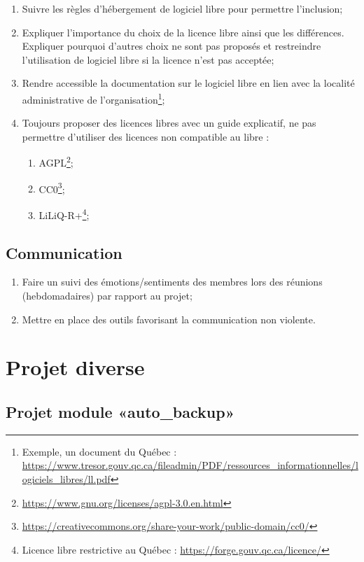 \begin{enumerate}
    \item Suivre les règles d'hébergement de logiciel libre pour permettre l'inclusion;
    \item Expliquer l'importance du choix de la licence libre ainsi que les différences. Expliquer pourquoi d'autres choix ne sont pas proposés et restreindre l'utilisation de logiciel libre si la licence n'est pas acceptée;
    \item Rendre accessible la documentation sur le logiciel libre en lien avec la localité administrative de l'organisation\footnote{Exemple, un document du Québec : \url{https://www.tresor.gouv.qc.ca/fileadmin/PDF/ressources_informationnelles/logiciels_libres/ll.pdf}};
    \item Toujours proposer des licences libres avec un guide explicatif, ne pas permettre d'utiliser des licences non compatible au libre :
    \begin{enumerate}
        \item AGPL\footnote{\url{https://www.gnu.org/licenses/agpl-3.0.en.html}};
        \item CC0\footnote{\url{https://creativecommons.org/share-your-work/public-domain/cc0/}};
        \item LiLiQ-R+\footnote{Licence libre restrictive au Québec : \url{https://forge.gouv.qc.ca/licence/}};
    \end{enumerate}
\end{enumerate}

\subsection{Communication}

\begin{enumerate}
    \item Faire un suivi des émotions/sentiments des membres lors des réunions (hebdomadaires) par rapport au projet;
    \item Mettre en place des outils favorisant la communication non violente.
\end{enumerate}

\section{Projet diverse}

\subsection{Projet module «auto\_backup»}

